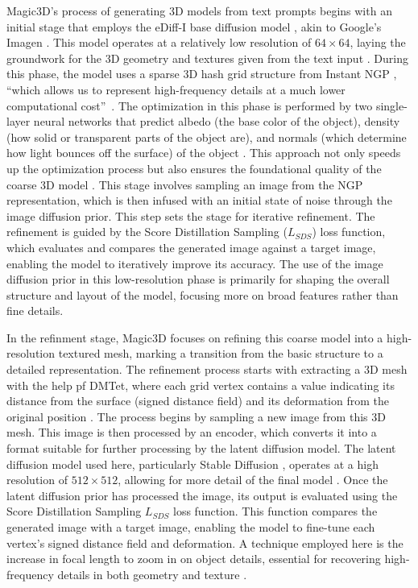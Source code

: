 Magic3D's process of generating 3D models from text prompts begins with an initial stage that employs the eDiff-I base diffusion model \citep{balaji2022eDiff-I}, akin to Google's Imagen \citep{saharia2022imagen}. This model operates at a relatively low resolution of \(64 \times 64\), laying the groundwork for the 3D geometry and textures given from the text input \citep{lin2023magic3d}. During this phase, the model uses a sparse 3D hash grid structure from Instant NGP \citep{M_ller_2022}, ``which allows us to represent high-frequency details at a much lower computational cost''~\citep{lin2023magic3d}. The optimization in this phase is performed by two single-layer neural networks that predict albedo (the base color of the object), density (how solid or transparent parts of the object are), and normals (which determine how light bounces off the surface) of the object \citep{lin2023magic3d}. This approach not only speeds up the optimization process but also ensures the foundational quality of the coarse 3D model \citep{lin2023magic3d}. 
This stage involves sampling an image from the NGP representation, which is then infused with an initial state of noise through the image diffusion prior. This step sets the stage for iterative refinement. The refinement is guided by the Score Distillation Sampling (\(L_{SDS}\)) loss function, which evaluates and compares the generated image against a target image, enabling the model to iteratively improve its accuracy. The use of the image diffusion prior in this low-resolution phase is primarily for shaping the overall structure and layout of the model, focusing more on broad features rather than fine details.

In the refinment stage, Magic3D focuses on refining this coarse model into a high-resolution textured mesh, marking a transition from the basic structure to a detailed representation. The refinement process starts with extracting a 3D mesh with the help pf DMTet, where each grid vertex contains a value indicating its distance from the surface (signed distance field) and its deformation from the original position \citep{shen2021DMTet, lin2023magic3d}. The process begins by sampling a new image from this 3D mesh. This image is then processed by an encoder, which converts it into a format suitable for further processing by the latent diffusion model. The latent diffusion model used here, particularly Stable Diffusion \citep{rombachStableDiffusion}, operates at a high resolution of \(512 \times 512\), allowing for more detail of the final model \citep{lin2023magic3d}. Once the latent diffusion prior has processed the image, its output is evaluated using the Score Distillation Sampling \(L_{SDS}\) loss function. This function compares the generated image with a target image, enabling the model to fine-tune each vertex's signed distance field and deformation. A technique employed here is the increase in focal length to zoom in on object details, essential for recovering high-frequency details in both geometry and texture \citep{lin2023magic3d}.

